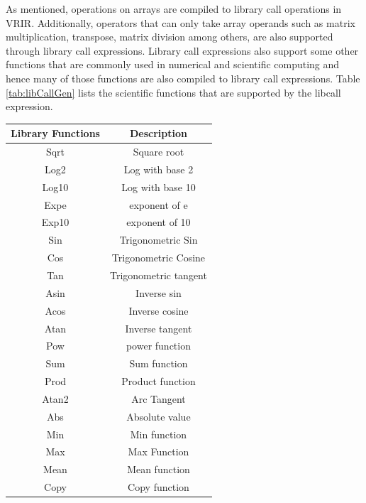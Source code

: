 As mentioned, operations on arrays are compiled to library call operations in VRIR. Additionally, operators that can only take array operands such as matrix multiplication, transpose, matrix division among others, are also supported through library call expressions. Library call expressions also support some other functions that are commonly used in numerical and scientific computing and hence many of those functions are also compiled to library call expressions. Table \ref{tab:libCallGen} lists the scientific functions that are supported by the \textsf{libcall} expression. 
\begin{table}[htbp]
\centering
\begin{tabular}{|c|c|}
\hline
Library Functions & Description           \\ \hline
Sqrt              & Square root           \\ \hline
Log2              & Log with base 2       \\ \hline
Log10             & Log with base 10      \\ \hline
Expe              & exponent of e         \\ \hline
Exp10             & exponent of 10        \\ \hline
Sin               & Trigonometric Sin     \\ \hline
Cos               & Trigonometric Cosine  \\ \hline
Tan               & Trigonometric tangent \\ \hline
Asin              & Inverse sin           \\ \hline
Acos              & Inverse cosine        \\ \hline
Atan              & Inverse tangent       \\ \hline
Pow               & power function        \\ \hline
Sum               & Sum function          \\ \hline
Prod              & Product function      \\ \hline
Atan2             & Arc Tangent           \\ \hline
Abs               & Absolute value        \\ \hline
Min               & Min function          \\ \hline
Max               & Max Function          \\ \hline
Mean              & Mean function         \\ \hline
Copy              & Copy function         \\ \hline

\end{tabular}
\end{table}
